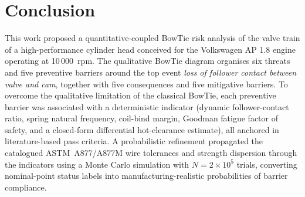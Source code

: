 
\section{Conclusion}\label{sec:conclusion}

This work proposed a quantitative-coupled BowTie risk analysis of the
valve train of a high-performance cylinder head conceived for the
Volkswagen AP 1.8 engine operating at 10\,000~rpm. The qualitative
BowTie diagram organises six threats and five preventive barriers
around the top event \emph{loss of follower contact between valve and
cam}, together with five consequences and five mitigative barriers. To
overcome the qualitative limitation of the classical BowTie, each
preventive barrier was associated with a deterministic indicator
(dynamic follower-contact ratio, spring natural frequency,
coil-bind margin, Goodman fatigue factor of safety, and a
closed-form differential hot-clearance estimate), all anchored in
literature-based pass criteria. A probabilistic refinement
propagated the catalogued ASTM~A877/A877M wire tolerances and
strength dispersion through the indicators using a Monte Carlo
simulation with $N=2\times 10^{5}$ trials, converting nominal-point
status labels into manufacturing-realistic probabilities of barrier
compliance.

